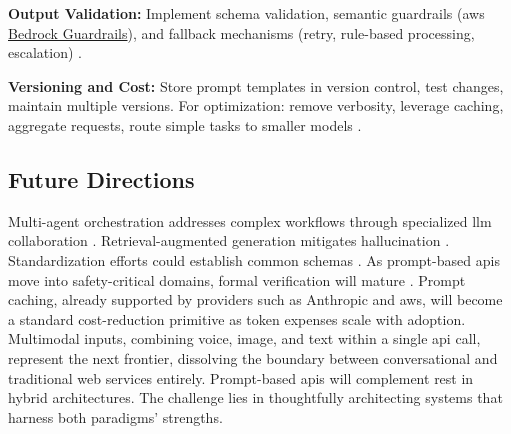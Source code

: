 \textbf{Output Validation:} Implement schema validation, semantic guardrails (\gls{aws} \href{https://aws.amazon.com/bedrock/guardrails/}{Bedrock Guardrails}), and fallback mechanisms (retry, rule-based processing, escalation) \cite{lercher_managing_2024, aws_bedrock_2025}.

\textbf{Versioning and Cost:} Store prompt templates in version control, test changes, maintain multiple versions. For optimization: remove verbosity, leverage caching, aggregate requests, route simple tasks to smaller models \cite{sahoo_systematic_2025}.

\subsection{Future Directions}

Multi-agent orchestration addresses complex workflows through specialized \gls{llm} collaboration \cite{schluntz_building_2024}. Retrieval-augmented generation mitigates hallucination \cite{zhou_hademif_2025}. Standardization efforts could establish common schemas \cite{white_prompt_2023}. As prompt-based \gls{api}s move into safety-critical domains, formal verification will mature \cite{aws_bedrock_2025}. Prompt caching, already supported by providers such as Anthropic and \gls{aws}, will become a standard cost-reduction primitive as token expenses scale with adoption. Multimodal inputs, combining voice, image, and text within a single \gls{api} call, represent the next frontier, dissolving the boundary between conversational and traditional web services entirely. Prompt-based \gls{api}s will complement \gls{rest} in hybrid architectures. The challenge lies in thoughtfully architecting systems that harness both paradigms' strengths.
